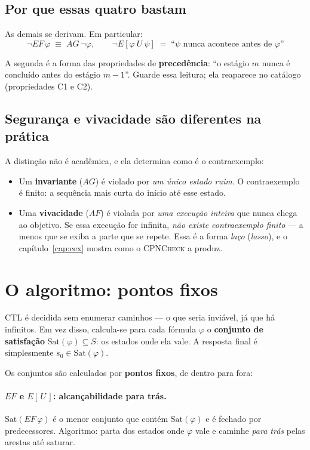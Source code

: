 \documentclass[11pt,a4paper]{report}
\newcommand{\cpn}{\textsc{CPNCheck}}
\begin{document}
\subsection*{Por que essas quatro bastam}

As demais se derivam. Em particular:
\[
  \neg EF\,\varphi \;\equiv\; AG\,\neg\varphi,
  \qquad
  \neg E[\varphi\ U\ \psi] \;=\; \text{``$\psi$ nunca acontece antes de $\varphi$''}
\]

A segunda é a forma das propriedades de \textbf{precedência}: ``o estágio $m$
nunca é concluído antes do estágio $m{-}1$''. Guarde essa leitura; ela
reaparece no catálogo (propriedades C1 e C2).

\subsection*{Segurança e vivacidade são diferentes na prática}

A distinção não é acadêmica, e ela determina como é o contraexemplo:

\begin{itemize}
  \item Um \textbf{invariante} ($AG$) é violado por \emph{um único estado ruim}.
        O contraexemplo é finito: a sequência mais curta do início até esse
        estado.
  \item Uma \textbf{vivacidade} ($AF$) é violada por \emph{uma execução
        inteira} que nunca chega ao objetivo. Se essa execução for infinita,
        \emph{não existe contraexemplo finito} --- a menos que se exiba a
        parte que se repete. Essa é a forma \emph{laço} (\emph{lasso}), e o
        capítulo~\ref{cap:cex} mostra como o \cpn{} a produz.
\end{itemize}

\section{O algoritmo: pontos fixos}

CTL é decidida sem enumerar caminhos --- o que seria inviável, já que há
infinitos. Em vez disso, calcula-se para cada fórmula $\varphi$ o
\textbf{conjunto de satisfação} $\mathrm{Sat}(\varphi) \subseteq S$: os estados
onde ela vale. A resposta final é simplesmente $s_0 \in \mathrm{Sat}(\varphi)$.

Os conjuntos são calculados por \textbf{pontos fixos}, de dentro para fora:

\paragraph{$EF$ e $E[\,U\,]$: alcançabilidade para trás.}
$\mathrm{Sat}(EF\,\varphi)$ é o menor conjunto que contém
$\mathrm{Sat}(\varphi)$ e é fechado por predecessores. Algoritmo: parta dos
estados onde $\varphi$ vale e caminhe \emph{para trás} pelas arestas até
saturar.
\end{document}
